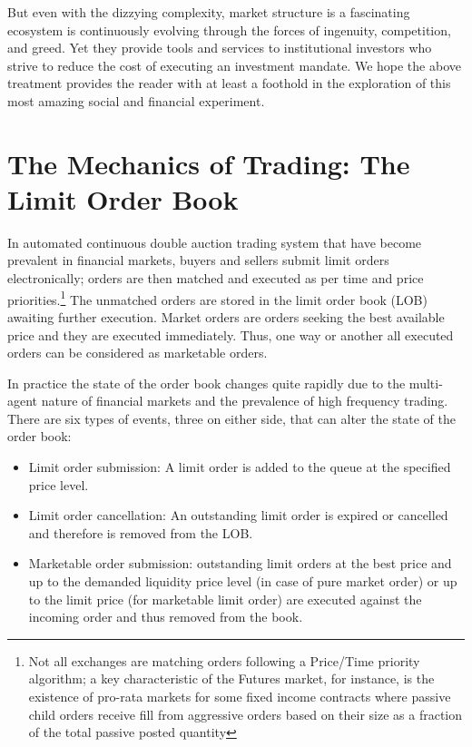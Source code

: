 But even with the dizzying complexity, market structure is a fascinating ecosystem is continuously evolving through the forces of ingenuity, competition, and greed. Yet they provide tools and services to institutional investors who strive to reduce the cost of executing an investment mandate. We hope the above treatment provides the reader with at least a foothold in the exploration of this most amazing social and financial experiment.



\section{The Mechanics of Trading: The Limit Order Book}



In automated continuous double auction trading system that have become prevalent in financial markets, buyers and sellers submit limit orders electronically; orders are then matched and executed as per time and price priorities.\footnote{Not all exchanges are matching orders following a Price/Time priority algorithm; a key characteristic of the Futures market, for instance, is the existence of pro-rata markets for some fixed income contracts where passive child orders receive fill from aggressive orders based on their size as a fraction of the total passive posted quantity} The unmatched orders are stored in the limit order book (LOB) awaiting further execution. Market orders are orders seeking the best available price and they are executed immediately. Thus, one way or another all executed orders can be considered as marketable orders.


In practice the state of the order book changes quite rapidly due to the multi-agent nature of financial markets and the prevalence of high frequency trading. There are six types of events, three on either side, that can alter the state of the order book:
	\begin{itemize}
	\item Limit order submission: A limit order is added to the queue at the specified price level.
	\item Limit order cancellation: An outstanding limit order is expired or cancelled and therefore is removed from the LOB.
	\item Marketable order submission: outstanding limit orders at the best price and up to the demanded liquidity price level (in case of pure market order) or up to the limit price (for marketable limit order) are executed against the incoming order and thus removed from the book.
	\end{itemize}


